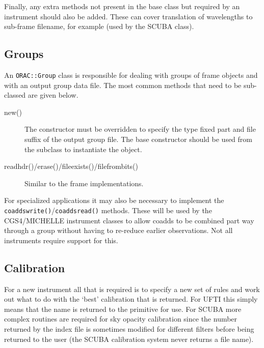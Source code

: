 \documentclass[twoside,11pt]{article}
\renewcommand{\_}{\texttt{\symbol{95}}}
\begin{document}
Finally, any extra methods not present in the base class but required
by an instrument should also be added. These can cover translation of
wavelengths to sub-frame filename, for example (used by the SCUBA class).


\subsection{Groups}

An \texttt{ORAC::Group} class is responsible for dealing with groups
of frame objects and with an output group data file.
The most common methods that need to be sub-classed are given below.

\begin{description}

\item[new()] \mbox{}

The constructor must be overridden to specify the type fixed part and
file suffix of the output group file. The base constructor should be
used from the subclass to instantiate the object.

\item[readhdr()/erase()/file\_exists()/file\_from\_bits()] \mbox{}

Similar to the frame implementations.


\end{description}

For specialized applications it may also be necessary to implement 
the \texttt{coaddswrite()}/\texttt{coaddsread()} methods. These will
be used by the CGS4/MICHELLE instrument classes to allow coadds to be 
combined part way through a group without having to re-reduce earlier
observations. Not all instruments require support for this.

\subsection{Calibration}

For a new instrument all that is required is to specify a new
set of rules and work out what to do with the `best' calibration that
is returned. For UFTI this simply means that the name is returned to
the primitive for use. For SCUBA more complex routines are required
for sky opacity calibration since the number returned by the index
file is sometimes modified for different filters before being returned 
to the user (the SCUBA calibration system never returns a file name).
\end{document}
